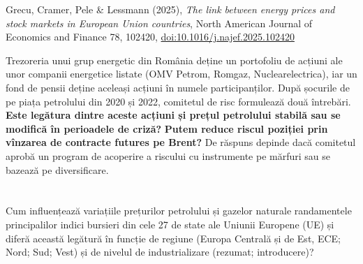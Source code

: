 
\renewcommand{\emqacase}{\T{Research case 3 (Lecture 3)}{Studiul de caz 3 (cursul 3)}}

%
          { Grecu, Cramer, Pele \& Lessmann (2025), \emph{The link between energy prices and stock markets in European Union countries},
           North American Journal of Economics and Finance 78, 102420, \href{https://doi.org/10.1016/j.najef.2025.102420}{doi:10.1016/j.najef.2025.102420}}

\begin{scenario}
%
{Trezoreria unui grup energetic din România deține un portofoliu de acțiuni ale unor companii energetice listate (OMV Petrom, Romgaz, Nuclearelectrica), iar un fond de pensii deține aceleași acțiuni în numele participanților.
După șocurile de pe piața petrolului din 2020 și 2022, comitetul de risc formulează două întrebări.
\textbf{Este legătura dintre aceste acțiuni și prețul petrolului stabilă sau se modifică în perioadele de criză?}
\textbf{Putem reduce riscul poziției prin vînzarea de contracte futures pe Brent?}
De răspuns depinde dacă comitetul aprobă un program de acoperire a riscului cu instrumente pe mărfuri sau se bazează pe diversificare.}
\end{scenario}

\section{}
\textbf{} %
{Cum influențează variațiile prețurilor petrolului și gazelor naturale randamentele principalilor indici bursieri din cele 27 de state ale Uniunii Europene (UE) și diferă această legătură în funcție de regiune (Europa Centrală și de Est, ECE; Nord; Sud; Vest) și de nivelul de industrializare (rezumat; introducere)?}

